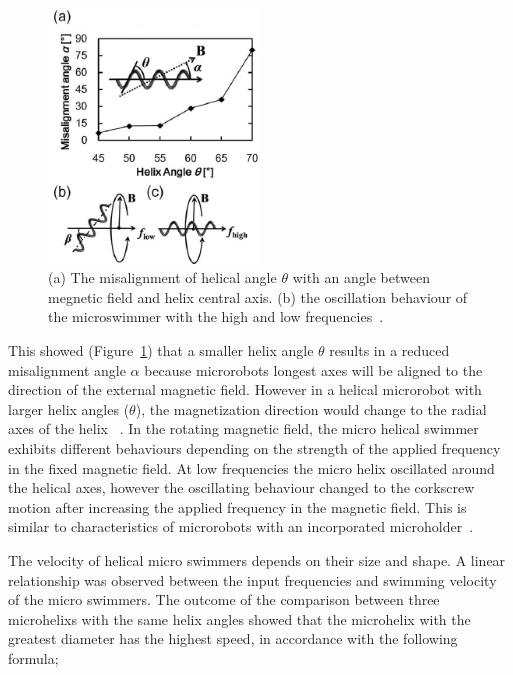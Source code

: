 \documentclass[12pt,a4paper,titlepage]{report}
\begin{document}
\begin{figure}
  \begin{center}
    \includegraphics[width=0.5\textwidth]{7}
  \caption[Effect of frequency on microswimmer\rq{}s behaviour]{(a) The misalignment of helical angle $\theta$ with an angle
between megnetic field and helix central axis. (b) the oscillation behaviour
of the microswimmer with the high and low frequencies~\citep{tottori2012magnetic}.}
  \label{ref7}
\end{center}
\end{figure}


This showed (Figure~\ref{ref7}) that a smaller helix angle $\theta$ results in a reduced misalignment 
angle $\alpha$ because microrobots longest axes will be aligned to the direction of the external magnetic field. 
However in a helical microrobot with larger helix angles ($\theta$), the magnetization direction would change to 
the radial axes of the helix  ~\citep{tottori2012magnetic}.
In the rotating magnetic field, the micro helical swimmer exhibits different behaviours depending on 
the strength of the applied frequency in the fixed magnetic field. At low frequencies the micro helix oscillated 
around the helical axes, however the oscillating behaviour changed to the 
corkscrew motion after increasing the applied frequency in the magnetic field. This is similar to characteristics of 
microrobots with an incorporated
 microholder~\citep{tottori2012magnetic}.

The velocity of helical micro swimmers depends on their size and shape. A linear relationship was 
observed between the input frequencies and swimming velocity of the micro swimmers. The outcome of 
the comparison between three microhelixs with the same helix angles showed that the microhelix with the
 greatest diameter has the highest speed, in accordance with the following formula;
\end{document}
